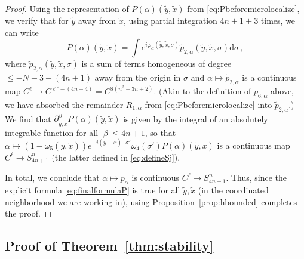 \documentclass[11pt]{amsart}
\theoremstyle{definition}
\numberwithin{equation}{section}
\newcommand{\abs}[1]{\lvert #1 \rvert}          %
\newcommand{\dd}{\mathrm{d}}
\begin{document}
\begin{proof}
    Using the representation of $P(\alpha)(\tilde{y},\tilde{x})$ from \eqref{eq:Pbeforemicrolocalize}, we verify that for $\tilde{y}$ away from $\tilde{x}$, using partial integration $4n+1+3$ times, we can write \[
        P(\alpha)(\tilde{y},\tilde{x}) = \int e^{i\varphi_\alpha(\tilde{y},\tilde{x},\sigma)} \tilde{p}_{2,\alpha}(\tilde{y},\tilde{x},\sigma)\dd\sigma\,,
    \] 
    where $\tilde{p}_{2,\alpha}(\tilde{y},\tilde{x},\sigma)$ is a sum of terms homogeneous of degree $\leq -N-3-(4n+1)$ away from the origin in $\sigma$ and $\alpha\mapsto \tilde{p}_{2,\alpha}$ is a continuous map $C^{\ell}\to C^{\ell'-(4n+4)}=C^{8(n^2+3n+2)}$. (Akin to the definition of $p_{6,\alpha}$ above, we have absorbed the remainder $R_{1,\alpha}$ from \eqref{eq:Pbeforemicrolocalize} into $\tilde{p}_{2,\alpha}$.) We find that $\partial^\beta_{\tilde{y},\tilde{x}}P(\alpha)(\tilde{y},\tilde{x})$ is given by the integral of an absolutely integrable function for all $\abs{\beta}\leq 4n+1$, so that $\alpha\mapsto (1-\omega_5(\tilde{y},\tilde{x}))e^{-i(\tilde{y}-\tilde{x})\cdot\sigma'}\omega_4(\sigma')P(\alpha)(\tilde{y},\tilde{x})$ is a continuous map $C^{\ell} \to S^n_{4n+1}$ (the latter defined in \eqref{eq:defineSj}).
    
    In total, we conclude that $\alpha\mapsto p_\alpha$ is continuous $C^{\ell} \to S^n_{4n+1}$. Thus, since the explicit formula \eqref{eq:finalformulaP} is true for all $\tilde{y},\tilde{x}$ (in the coordinated neighborhood we are working in), using Proposition~\ref{prop:hbounded} completes the proof.
\end{proof}

\subsection{Proof of Theorem~\ref{thm:stability}}
\end{document}
